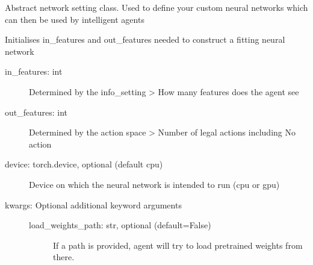 \documentclass[letterpaper,10pt,english]{sphinxmanual}
\begin{document}
\begin{fulllineitems}
\label{\detokenize{MultiAgentMarketRL:network_models.NetworkSetting}}
\sphinxAtStartPar
Abstract network setting class.
Used to define your custom neural networks which can then be used by intelligent agents

\begin{fulllineitems}
\label{\detokenize{MultiAgentMarketRL:network_models.NetworkSetting.__init__}}
\sphinxAtStartPar
Initialises in\_features and out\_features needed to construct a fitting neural network
\begin{description}
\item[{in\_features: int}] \leavevmode
\sphinxAtStartPar
Determined by the info\_setting \textendash{}\textgreater{} How many features does the agent see

\item[{out\_features: int}] \leavevmode
\sphinxAtStartPar
Determined by the action space \textendash{}\textgreater{} Number of legal actions including No action

\item[{device: torch.device, optional (default cpu)}] \leavevmode
\sphinxAtStartPar
Device on which the neural network is intended to run (cpu or gpu)

\item[{kwargs: Optional additional keyword arguments}] \leavevmode\begin{description}
\item[{load\_weights\_path: str, optional (default=False)}] \leavevmode
\sphinxAtStartPar
If a path is provided, agent will try to load pretrained weights from there.

\end{description}


\end{description}
\end{fulllineitems}
\end{fulllineitems}
\end{document}
